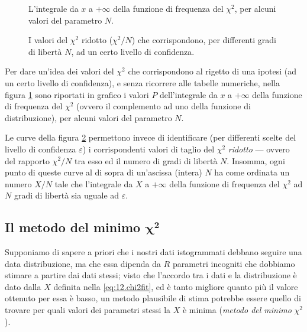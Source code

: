 \begin{figure}[hbtp]
  \vspace*{2ex}
  \begin{center} {
    
  } \end{center}
  \caption[La funzione di distribuzione del $\chi^2$]
  {L'integrale da $x$ a $+\infty$ della funzione di
    frequenza del $\chi^2$, per alcuni valori del parametro
    $N$.}
  \label{fig:chicdf}
\end{figure}

\begin{figure}[hbtp]
  \vspace*{2ex}
  \begin{center} {
    
  } \end{center}
  \caption[La funzione di distribuzione del $\chi^2$
  ridotto]
  {I valori del $\chi^2$ ridotto ($\chi^2/N$) che
    corrispondono, per differenti gradi di libert\`a $N$, ad
    un certo livello di confidenza.}
  \label{fig:chirid}
\end{figure}

Per dare un'idea dei valori del $\chi^2$ che corrispondono
al rigetto di una ipotesi (ad un certo livello di
confidenza), e senza ricorrere alle tabelle numeriche, nella
figura \ref{fig:chicdf} sono riportati in grafico i valori
$P$ dell'integrale da $x$ a $+\infty$ della funzione di
frequenza del $\chi^2$ (ovvero il complemento ad uno della
funzione di distribuzione), per alcuni valori del parametro
$N$.

Le curve della figura \ref{fig:chirid} permettono invece di
identificare (per differenti scelte del livello di
confidenza $\varepsilon$) i corrispondenti valori di taglio
del $\chi^2$ \emph{ridotto} --- ovvero del rapporto
$\chi^2/N$ tra esso ed il numero di gradi di libert\`a $N$.
Insomma, ogni punto di queste curve al di sopra di
un'ascissa (intera) $N$ ha come ordinata un numero $X/N$
tale che l'integrale da $X$ a $+\infty$ della funzione di
frequenza del $\chi^2$ ad $N$ gradi di libert\`a sia uguale
ad $\varepsilon$.%

\subsection[Il metodo del minimo $\chi^2$]{Il metodo
  del minimo $\boldsymbol{\chi}^{\boldsymbol{2}}$}%
Supponiamo di sapere a priori che i nostri dati istogrammati
debbano seguire una data distribuzione, ma che essa dipenda
da $R$ parametri incogniti che dobbiamo stimare a partire
dai dati stessi; visto che l'accordo tra i dati e la
distribuzione \`e dato dalla $X$ definita nella
\eqref{eq:12.chi2fit}, ed \`e tanto migliore quanto pi\`u il
valore ottenuto per essa \`e basso, un metodo plausibile di
stima potrebbe essere quello di trovare per quali valori dei
parametri stessi la $X$ \`e minima (\emph{metodo del minimo}
$\chi^2$).

